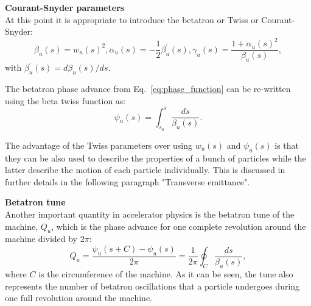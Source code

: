 


\textbf{Courant-Snyder parameters}\\
At this point it is appropriate to introduce the betatron or Twiss or Courant-Snyder:%
\begin{subequations}\label{eq:twiss_func}
    \begin{equation}
        \beta_u(s) = w_u(s)^2,
    \end{equation}    
    \begin{equation}
       \alpha_u(s) = -\frac{1}{2} \beta^{\prime}_u(s),
    \end{equation} 
    \begin{equation}
       \gamma_u(s) = \frac{1+\alpha_u(s)^2}{\beta_u(s)},
    \end{equation}
\end{subequations}
with $\beta^{\prime}_u(s) = d\beta_u(s)/ds$.

The betatron phase advance from Eq.~\eqref{eq:phase_function} can be re-written using the beta twiss function as:
\begin{equation}\label{eq:phase_advance_definition_with_twiss}
    \psi_u(s)= \int_{s_0}^{s} \frac{ds}{\beta_u(s)}.
\end{equation}

The advantage of the Twiss parameters over using $w_u(s)$ and $\psi_u(s)$ is that they can be also used to describe the properties of a bunch of particles while the latter describe the motion of each particle individually. This is discussed in further details in the following paragraph "Transverse emittance". %

\textbf{Betatron tune}\\
Another important quantity in accelerator physics is the betatron tune of the machine, $Q_u$, which is the phase advance for one complete revolution around the machine divided by $2\pi$:
\begin{equation}\label{eq:betatron_tune}
    Q_u = \frac{\psi_u(s+C)-\psi_u(s)}{2\pi} = \frac{1}{2\pi} \oint_C \frac{ds}{\beta_u(s)},
\end{equation}
where $C$ is the circumference of the machine. As it can be seen, the tune also represents the number of betatron oscillations that a particle undergoes during one full revolution around the machine. 

